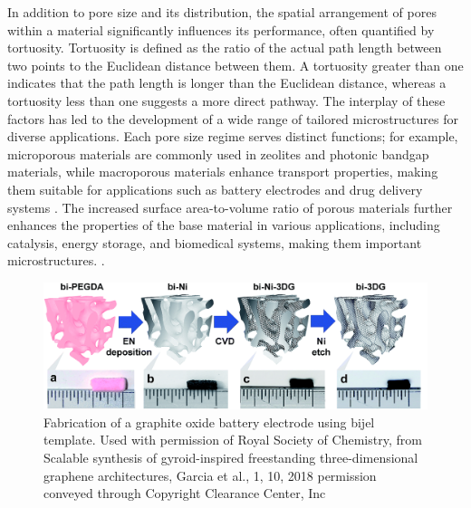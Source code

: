 In addition to pore size and its distribution, the spatial arrangement of pores within a material significantly influences its performance, 
often quantified by tortuosity. Tortuosity is defined as the ratio of the actual path length between two points to the Euclidean distance 
between them. A tortuosity greater than one indicates that the path length is longer than the Euclidean distance, whereas a tortuosity less 
than one suggests a more direct pathway. The interplay of these factors has led to the development of a wide range of tailored microstructures 
for diverse applications. Each pore size regime serves distinct functions; for example, microporous materials are commonly used in zeolites and 
photonic bandgap materials, while macroporous materials enhance transport properties, making them suitable for applications such as battery 
electrodes and drug delivery systems \cite{chen_tortuosity_2020, ebner_tortuosity_2014}. The increased surface area-to-volume ratio of porous 
materials further enhances the properties of the base material in various applications, including catalysis, energy storage, and biomedical 
systems, making them important microstructures. \cite{cha_bicontinuous_2019, samdani_bicontinuous_2017, thorson_bijel-templated_2019, zhao_highly_2014}.  

\begin{figure}
    \centering
    \includegraphics[scale = 0.5]{figures/introduction/bijel_templating.png}
    \caption{Fabrication of a graphite oxide battery electrode using bijel template. Used with permission of 
    Royal Society of Chemistry, from Scalable synthesis of gyroid-inspired freestanding three-dimensional graphene architectures, 
    Garcia et al., 1, 10, 2018 permission conveyed through Copyright Clearance Center, Inc}
    \label{fig:bijel_template}
\end{figure}

